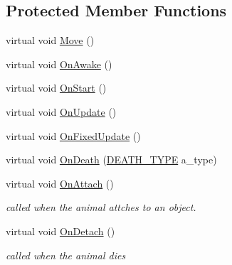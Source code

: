 \subsection*{Protected Member Functions}
\begin{DoxyCompactItemize}
\item 
virtual void \mbox{\hyperlink{class_animal_a088f83df034d3965382b6d8149a7143d}{Move}} ()
\item 
virtual void \mbox{\hyperlink{class_animal_a8ed14f752254b7033466bbd0c846a972}{On\+Awake}} ()
\item 
virtual void \mbox{\hyperlink{class_animal_a5e8ba3858f4d2c35c4a8d42fdbcc66b5}{On\+Start}} ()
\item 
virtual void \mbox{\hyperlink{class_animal_a0b0cf85dbc03ad6ed1878e90c2ac84b1}{On\+Update}} ()
\item 
virtual void \mbox{\hyperlink{class_animal_aebce764681f2a949d72b80766beb0752}{On\+Fixed\+Update}} ()
\item 
virtual void \mbox{\hyperlink{class_animal_a86612d846fcd1fcf08f7b89586aa11b7}{On\+Death}} (\mbox{\hyperlink{_animal_8cs_aa09ea87b75a706096f010aef7b9b1826}{D\+E\+A\+T\+H\+\_\+\+T\+Y\+PE}} a\+\_\+type)
\item 
virtual void \mbox{\hyperlink{class_animal_a1f3b9a46215ec3e502ff609bbf0b4e78}{On\+Attach}} ()
\begin{DoxyCompactList}\small\item\em called when the animal attches to an object. \end{DoxyCompactList}\item 
virtual void \mbox{\hyperlink{class_animal_aeea0f2bdfa40b980440c8a4ff4820479}{On\+Detach}} ()
\begin{DoxyCompactList}\small\item\em called when the animal dies \end{DoxyCompactList}\end{DoxyCompactItemize}
